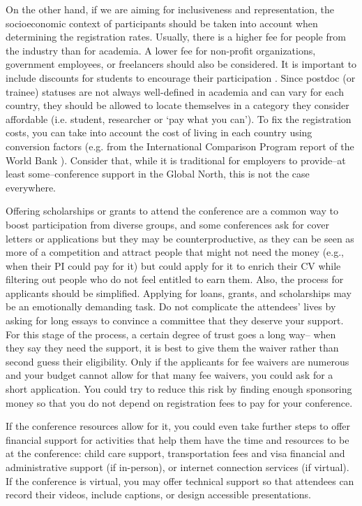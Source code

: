 \documentclass[10pt,letterpaper]{article}
\begin{document}
On the other hand, if we are aiming for inclusiveness and representation, the socioeconomic context of participants should be taken into account when determining the registration rates. Usually, there is a higher fee for people from the industry than for academia. A lower fee for non-profit organizations, government employees, or freelancers should also be considered. It is important to include discounts for students to encourage their participation \cite{sarabipourChangingScientificMeetings2021, andalibPostdocQueueLabour2018, kaplanPostdocNot2012}. Since postdoc (or trainee) statuses are not always well-defined in academia and can vary for each country, they should be allowed to locate themselves in a category they consider affordable (i.e. student, researcher or `pay what you can'). To fix the registration costs, you can take into account the cost of living in each country using conversion factors (e.g. from the International Comparison Program report of the World Bank \cite{arendDisparityConferenceRegistration2019}). Consider that, while it is traditional for employers to provide--at least some--conference support in the Global North, this is not the case everywhere. 

Offering scholarships or grants to attend the conference are a common way to boost participation from diverse groups, and some conferences ask for cover letters or applications  but they may be counterproductive, as they can be seen as more of a competition and attract people that might not need the money (e.g., when their PI could pay for it) but could apply for it to enrich their CV while filtering out people who do not feel entitled to earn them. 
Also, the process for applicants should be simplified. Applying for loans, grants, and scholarships may be an emotionally demanding task. Do not complicate the attendees' lives by asking for long essays to convince a committee that they deserve your support. For this stage of the process, a certain degree of trust goes a long way-- when they say they need the support, it is best to give them the waiver rather than second guess their eligibility. 
Only if the applicants for fee waivers are numerous and your budget cannot allow for that many fee waivers, you could ask for a short application. You could try to reduce this risk by finding enough sponsoring money so that you do not depend on registration fees to pay for your conference.

If the conference resources allow for it, you could even take further steps to offer financial support for activities that help them have the time and resources to be at the conference: child care support, transportation fees and visa financial and administrative support (if in-person), or internet connection services (if virtual). If the conference is virtual, you may offer technical support so that attendees can record their videos, include captions, or design accessible presentations.
\end{document}
